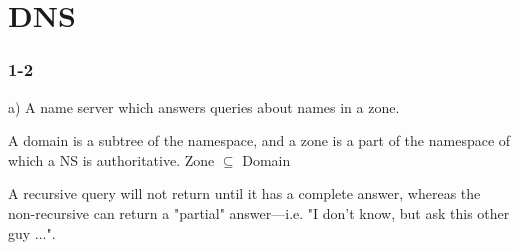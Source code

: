 
\chapter{DNS}
\subsection{1-2}
a) A name server which answers queries about names in a zone.

A domain is a subtree of the namespace, and a zone is a part of the namespace of which a NS is authoritative. Zone $\subseteq$ Domain

A recursive query will not return until it has a complete answer, whereas the non-recursive can return a "partial" answer---i.e. "I don't know, but ask this other guy ...".






